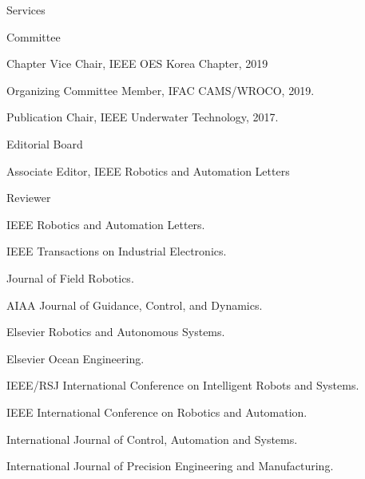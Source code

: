 \begin{rSection}{Services}


\begin{rSubsection}{Committee}{}{}{}
  \item Chapter Vice Chair, IEEE OES Korea Chapter, 2019
  \item Organizing Committee Member, IFAC CAMS/WROCO, 2019.
  \item Publication Chair, IEEE Underwater Technology, 2017.





\end{rSubsection}

\begin{rSubsection}{Editorial Board}{}{}{}
  \item Associate Editor, IEEE Robotics and Automation Letters
\end{rSubsection}

\begin{rSubsection}{Reviewer}{}{}{}
  \item IEEE Robotics and Automation Letters.
  \item IEEE Transactions on Industrial Electronics.
  \item Journal of Field Robotics.
  \item AIAA Journal of Guidance, Control, and Dynamics.
  \item Elsevier Robotics and Autonomous Systems.
  \item Elsevier Ocean Engineering.
  \item IEEE/RSJ International Conference on Intelligent Robots and Systems.
  \item IEEE International Conference on Robotics and Automation.
  \item International Journal of Control, Automation and Systems.
  \item International Journal of Precision Engineering and Manufacturing.
\end{rSubsection}

\end{rSection}
